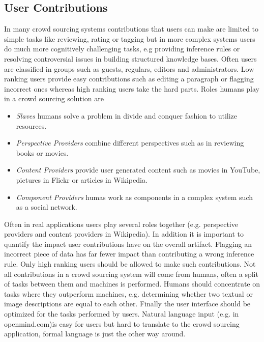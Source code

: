 \documentclass{sig-alternate}
\begin{document}
\subsection{User Contributions}
In many crowd sourcing systems contributions that users can make are limited to simple tasks like reviewing, rating or tagging but in more complex systems users do much more cognitively challenging tasks, e.g providing inference rules or resolving controversial issues in building structured knowledge bases. Often users are classified in groups such as guests, regulars, editors and administrators. Low ranking users provide easy contributions such as editing a paragraph or flagging incorrect ones whereas high ranking users take the hard parts. 
\newline\newline
Roles humans play in a crowd sourcing solution are
\begin{itemize}
\item \textit{Slaves} humans solve a problem in divide and conquer fashion to utilize resources.
\item \textit{Perspective Providers} combine different perspectives such as in reviewing books or movies.
\item \textit{Content Providers} provide user generated content such as movies in YouTube, pictures in Flickr or articles in Wikipedia.
\item \textit{Component Providers} humas work as components in a complex system such as a social network.
\end{itemize}
Often in real applications users play several roles together (e.g. perspective providers and content providers in Wikipedia).
\newline\newline
In addition it is important to quantify the impact user contributions have on the overall artifact. Flagging an incorrect piece of data has far fewer impact than contributing a wrong inference rule. Only high ranking users should be allowed to make such contributions. Not all contributions in a crowd sourcing system will come from humans, often a split of tasks between them and machines is performed. Humans should concentrate on tasks where they outperform machines, e.g. determining whether two textual or image descriptions are equal to each other.
\newline\newline
Finally the user interface should be optimized for the tasks performed by users. Natural language input (e.g. in openmind.com)is easy for users but hard to translate to the crowd sourcing application, formal language is just the other way around.
\end{document}
